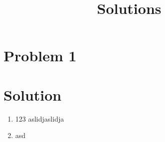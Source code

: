 \documentclass{article}
\begin{document}


\section*{Problem 1}

\section*{Solution}
\title{Solutions}
\begin{enumerate}
        \item 123
aslidjaslidja
        \item asd

\end{enumerate}
\end{document}
